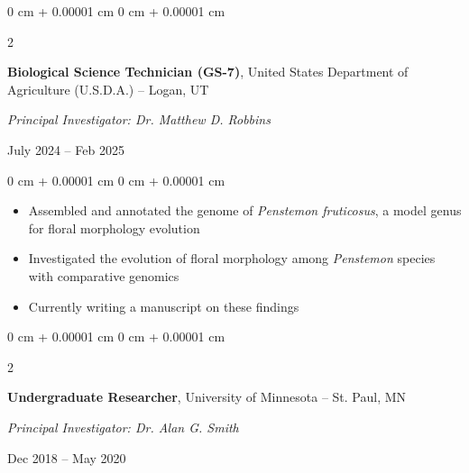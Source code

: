 \documentclass[10pt, letterpaper]{article}
\newenvironment{highlights}{
    \begin{itemize}[
        topsep=0.10 cm,
        parsep=0.10 cm,
        partopsep=0pt,
        itemsep=0pt,
        leftmargin=0 cm + 10pt
    ]
}{
    \end{itemize}
} %
\newenvironment{onecolentry}{
    \begin{adjustwidth}{
        0 cm + 0.00001 cm
    }{
        0 cm + 0.00001 cm
    }
}{
    \end{adjustwidth}
} %
\newenvironment{twocolentry}[2][]{
    \onecolentry
    \def\secondColumn{#2}
    \setcolumnwidth{\fill, 4.5 cm}
    \begin{paracol}{2}
}{
    \switchcolumn \raggedleft \secondColumn
    \end{paracol}
    \endonecolentry
} %
\begin{document}
        \vspace{0.2 cm}


        \begin{samepage}        
            \begin{twocolentry}{
                July 2024 – Feb 2025
                }
                \textbf{Biological Science Technician (GS-7)}, United States Department of Agriculture (U.S.D.A.) -- Logan, UT
                
                \vspace{0.05 cm}

                \textit{Principal Investigator: Dr. Matthew D. Robbins}
            \end{twocolentry}
        \end{samepage}
        
        \vspace{0.10 cm}
        
        \begin{onecolentry}
            \begin{highlights}
                \item Assembled and annotated the genome of \textit{Penstemon fruticosus}, a model genus for floral morphology evolution
                \item Investigated the evolution of floral morphology among \textit{Penstemon} species with comparative genomics
                \item Currently writing a manuscript on these findings
            \end{highlights}
        \end{onecolentry}


        \vspace{0.2 cm}
        

        \begin{samepage} 
            \begin{twocolentry}{
                Dec 2018 – May 2020
                }
                \textbf{Undergraduate Researcher}, University of Minnesota -- St. Paul, MN
                
                \vspace{0.05 cm}

                \textit{Principal Investigator: Dr. Alan G. Smith}
            \end{twocolentry}
        \end{samepage}            

        \vspace{0.10 cm}
        
\end{document}
